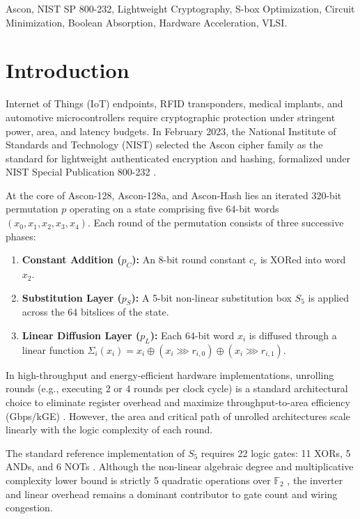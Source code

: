 \documentclass[journal,10pt]{IEEEtran}
\begin{document}
\begin{IEEEkeywords}
Ascon, NIST SP 800-232, Lightweight Cryptography, S-box Optimization, Circuit Minimization, Boolean Absorption, Hardware Acceleration, VLSI.
\end{IEEEkeywords}

\section{Introduction}
 Internet of Things (IoT) endpoints, RFID transponders, medical implants, and automotive microcontrollers require cryptographic protection under stringent power, area, and latency budgets. In February 2023, the National Institute of Standards and Technology (NIST) selected the Ascon cipher family as the standard for lightweight authenticated encryption and hashing, formalized under NIST Special Publication 800-232 \cite{nist_ascon}.

At the core of Ascon-128, Ascon-128a, and Ascon-Hash lies an iterated 320-bit permutation $p$ operating on a state comprising five 64-bit words $(x_0, x_1, x_2, x_3, x_4)$. Each round of the permutation consists of three successive phases:
\begin{enumerate}
    \item \textbf{Constant Addition ($p_C$):} An 8-bit round constant $c_r$ is XORed into word $x_2$.
    \item \textbf{Substitution Layer ($p_S$):} A 5-bit non-linear substitution box $S_5$ is applied across the 64 bitslices of the state.
    \item \textbf{Linear Diffusion Layer ($p_L$):} Each 64-bit word $x_i$ is diffused through a linear function $\Sigma_i(x_i) = x_i \oplus (x_i \ggg r_{i,0}) \oplus (x_i \ggg r_{i,1})$.
\end{enumerate}

In high-throughput and energy-efficient hardware implementations, unrolling rounds (e.g., executing 2 or 4 rounds per clock cycle) is a standard architectural choice to eliminate register overhead and maximize throughput-to-area efficiency (Gbps/kGE) \cite{ascon_hw_survey}. However, the area and critical path of unrolled architectures scale linearly with the logic complexity of each round.

The standard reference implementation of $S_5$ requires 22 logic gates: 11 XORs, 5 ANDs, and 6 NOTs \cite{dobraunig_ascon}. Although the non-linear algebraic degree and multiplicative complexity lower bound is strictly 5 quadratic operations over $\mathbb{F}_2$ \cite{boyar_bounds}, the inverter and linear overhead remains a dominant contributor to gate count and wiring congestion.
\end{document}
